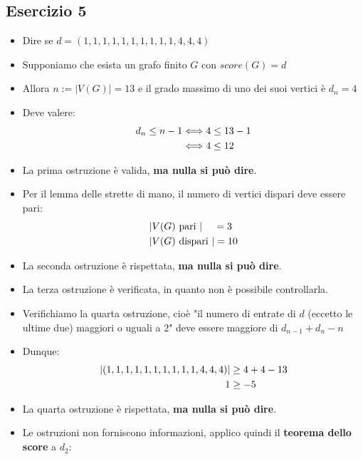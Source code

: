 \documentclass[10pt]{article}
\begin{document}
	\subsection{Esercizio 5}
	\begin{itemize}
	\item
	Dire se $d = (1,1,1,1,1,1,1,1,1,1,4,4,4)$
	\item
	Supponiamo che esista un grafo finito $G$ con $score(G) = d$
	\item
	Allora $n := |V(G)| = 13$ e il grado massimo di uno dei suoi vertici è $d_n = 4$
	\item
	Deve valere:
	\begin{equation}
	\begin{split}
		d_n \leq n - 1 &\Longleftrightarrow 4 \leq 13 - 1  \\
		&\Longleftrightarrow 4 \leq 12
		\notag
		\end{split}
	\end{equation}
	\item
	La prima ostruzione è valida, \textbf{ma nulla si può dire}.
	\item
	Per il lemma delle strette di mano, il numero di vertici dispari deve essere pari:
	\begin{equation}
	\begin{split}
		|&V(G) \textrm{ pari }| \quad\, =  3\\
		|&V(G) \textrm{ dispari }| = 10 
		\notag
		\end{split}
	\end{equation}
	\item
	La seconda ostruzione è rispettata, \textbf{ma nulla si può dire}.
	\item
	La terza ostruzione è verificata, in quanto non è possibile controllarla.
	\item
	Verifichiamo la quarta ostruzione, cioè "il numero di entrate di $d$ (eccetto le ultime due) maggiori o uguali a $2$" deve essere maggiore di $d_{n-1} + d_n - n$
	\item
	Dunque:
	\begin{equation}
	\begin{split}
		|(1,1,1,1,1,1,1,1,1,1,4,4,4)| &\geq 4+4-13 \\
		1 &\geq -5
		\notag
		\end{split}
	\end{equation}
	\item
	La quarta ostruzione è rispettata, \textbf{ma nulla si può dire}.
	\item
	Le ostruzioni non forniscono informazioni, applico quindi il \textbf{teorema dello score} a $d_2$:

\end{itemize}
\end{document}
